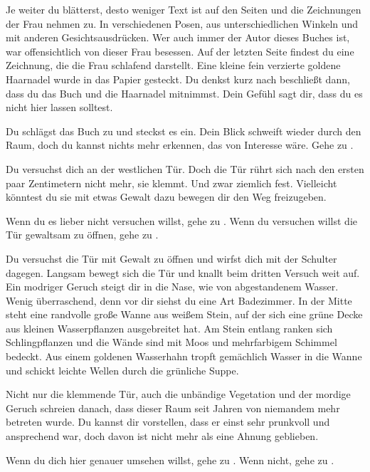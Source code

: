 Je weiter du blätterst, desto weniger Text ist auf den Seiten und die Zeichnungen der Frau nehmen zu. In verschiedenen Posen, aus unterschiedlichen Winkeln und mit anderen Gesichtsausdrücken. Wer auch immer der Autor dieses Buches ist, war offensichtlich von dieser Frau besessen. Auf der letzten Seite findest du eine Zeichnung, die die Frau schlafend darstellt. Eine kleine fein verzierte goldene Haarnadel wurde in das Papier gesteckt. Du denkst kurz nach beschließt dann, dass du das Buch  und die Haarnadel  mitnimmst. Dein Gefühl sagt dir, dass du es nicht hier lassen solltest.

Du schlägst das Buch zu und steckst es ein. Dein Blick schweift wieder durch den Raum, doch du kannst nichts mehr erkennen, das von Interesse wäre.
Gehe zu .


Du versuchst dich an der westlichen Tür. Doch die Tür rührt sich nach den ersten paar Zentimetern nicht mehr, sie klemmt. Und zwar ziemlich fest. Vielleicht könntest du sie mit etwas Gewalt dazu bewegen dir den Weg freizugeben.

Wenn du es lieber nicht versuchen willst, gehe zu .
Wenn du versuchen willst die Tür gewaltsam zu öffnen, gehe zu .


Du versuchst die Tür mit Gewalt zu öffnen und wirfst dich mit der Schulter dagegen. Langsam bewegt sich die Tür und knallt beim dritten Versuch weit auf. Ein modriger Geruch steigt dir in die Nase, wie von abgestandenem Wasser. Wenig überraschend, denn vor dir siehst du eine Art Badezimmer. In der Mitte steht eine randvolle große Wanne aus weißem Stein, auf der sich eine grüne Decke aus kleinen Wasserpflanzen ausgebreitet hat. Am Stein entlang ranken sich Schlingpflanzen und die Wände sind mit Moos und mehrfarbigem Schimmel bedeckt. Aus einem goldenen Wasserhahn tropft gemächlich Wasser in die Wanne und schickt leichte Wellen durch die grünliche Suppe.

Nicht nur die klemmende Tür, auch die unbändige Vegetation und der mordige Geruch schreien danach, dass dieser Raum seit Jahren von niemandem mehr betreten wurde. Du kannst dir vorstellen, dass er einst sehr prunkvoll und ansprechend war, doch davon ist nicht mehr als eine Ahnung geblieben.

Wenn du dich hier genauer umsehen willst, gehe zu .
Wenn nicht, gehe zu .

